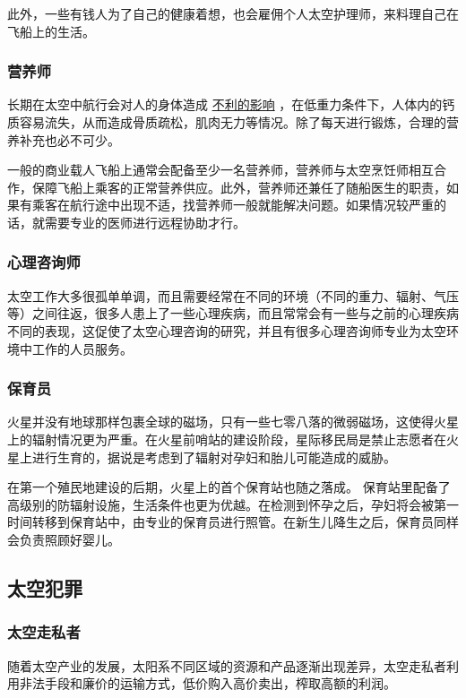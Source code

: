 \documentclass[letterpaper,10pt]{sphinxmanual}
\begin{document}
此外，一些有钱人为了自己的健康着想，也会雇佣个人太空护理师，来料理自己在飞船上的生活。


\subsubsection{营养师}
\label{profession:id25}
长期在太空中航行会对人的身体造成 \href{http://zh.wikipedia.org/zh-cn/\%E5\%A4\%AA\%E7\%A9\%BA\%E8\%88\%AA\%E8\%A1\%8C\%E5\%B0\%8D\%E4\%BA\%BA\%E9\%AB\%94\%E7\%9A\%84\%E5\%BD\%B1\%E9\%9F\%BF}{不利的影响} ，在低重力条件下，人体内的钙质容易流失，从而造成骨质疏松，肌肉无力等情况。除了每天进行锻炼，合理的营养补充也必不可少。

一般的商业载人飞船上通常会配备至少一名营养师，营养师与太空烹饪师相互合作，保障飞船上乘客的正常营养供应。此外，营养师还兼任了随船医生的职责，如果有乘客在航行途中出现不适，找营养师一般就能解决问题。如果情况较严重的话，就需要专业的医师进行远程协助才行。


\subsubsection{心理咨询师}
\label{profession:id27}
太空工作大多很孤单单调，而且需要经常在不同的环境（不同的重力、辐射、气压等）之间往返，很多人患上了一些心理疾病，而且常常会有一些与之前的心理疾病不同的表现，这促使了太空心理咨询的研究，并且有很多心理咨询师专业为太空环境中工作的人员服务。


\subsubsection{保育员}
\label{profession:id28}
火星并没有地球那样包裹全球的磁场，只有一些七零八落的微弱磁场，这使得火星上的辐射情况更为严重。在火星前哨站的建设阶段，星际移民局是禁止志愿者在火星上进行生育的，据说是考虑到了辐射对孕妇和胎儿可能造成的威胁。

在第一个殖民地建设的后期，火星上的首个保育站也随之落成。
保育站里配备了高级别的防辐射设施，生活条件也更为优越。在检测到怀孕之后，孕妇将会被第一时间转移到保育站中，由专业的保育员进行照管。在新生儿降生之后，保育员同样会负责照顾好婴儿。


\subsection{太空犯罪}
\label{profession:id29}

\subsubsection{太空走私者}
\label{profession:id30}
随着太空产业的发展，太阳系不同区域的资源和产品逐渐出现差异，太空走私者利用非法手段和廉价的运输方式，低价购入高价卖出，榨取高额的利润。
\end{document}
